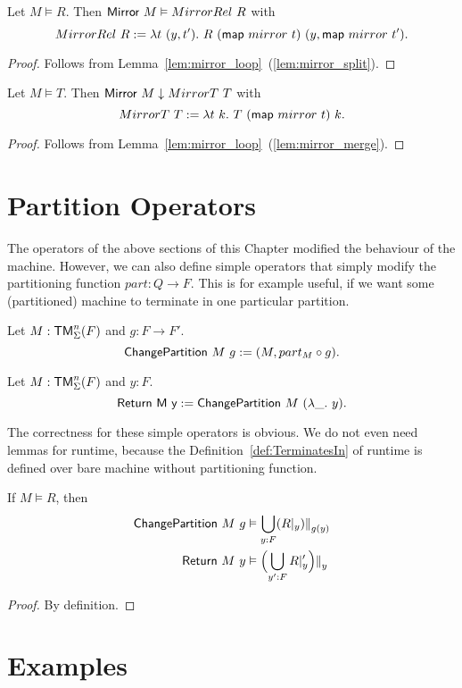 \begin{lemma}
  Let $M \vDash R$.  Then $\textsf{Mirror}~M \vDash MirrorRel~R$ with
  \[
    MirrorRel~R := \lambda t~(y, t').~ R~(\textsf{map}~mirror~t)~(y, \textsf{map}~mirror~t').
  \]
\end{lemma}
\begin{proof}
  Follows from Lemma~\ref{lem:mirror_loop}~(\ref{lem:mirror_split}).
\end{proof}
\begin{lemma}
  Let $M \vDash T$.  Then $\textsf{Mirror}~M \downarrow MirrorT~T$ with
  \[
    MirrorT~T := \lambda t~k.~ T~(\textsf{map}~mirror~t)~k.
  \]
\end{lemma}
\begin{proof}
  Follows from Lemma~\ref{lem:mirror_loop}~(\ref{lem:mirror_merge}).
\end{proof}




\section{Partition Operators}
\label{sec:partition-op}

The operators of the above sections of this Chapter modified the behaviour of the machine.  However, we can also define simple operators that simply
modify the partitioning function $part : Q \to F$.  This is for example useful, if we want some (partitioned) machine to terminate in one particular
partition.

\begin{definition}[$\MS{ChangePartition}$]
  Let $M:\textsf{TM}_\Sigma^n(F)$ and $g : F \to F'$.
  \[ \textsf{ChangePartition}~M~g := (M, part_M \circ g). \]
\end{definition}

\begin{definition}
  Let $M:\textsf{TM}_\Sigma^n(F)$ and $y:F$.
  \[ \textsf{Return~M~y} := \textsf{ChangePartition}~M~(\lambda \_.~y). \]
\end{definition}

The correctness for these simple operators is obvious.  We do not even need lemmas for runtime, because the Definition~\ref{def:TerminatesIn} of
runtime is defined over bare machine without partitioning function.
\begin{lemma}
  If $M \vDash R$, then
  \begin{alignat*}{1}
    \textsf{ChangePartition}~M~g & \vDash \bigcup_{y:F} (R {|}_{y}) {|\mkern-1.5mu|}_{g(y)} \\
    \textsf{Return}~M~y          & \vDash \Bigl( \bigcup_{y':F} R {|}_{y}' \Bigr) {|\mkern-1.5mu|}_{y}
  \end{alignat*}
\end{lemma}
\begin{proof}
  By definition.
\end{proof}


\section{Examples}
\label{sec:combining-examples}





